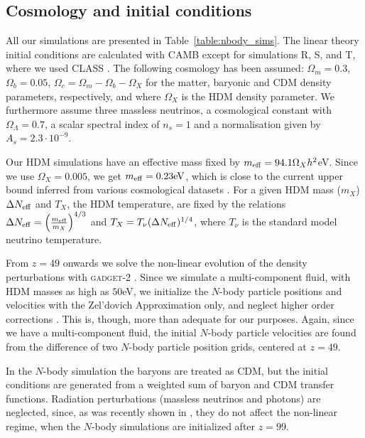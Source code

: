 \documentclass[11pt,a4paper]{article}
\renewcommand\({\left(}
\renewcommand\){\right)}
\renewcommand\[{\left[}
\renewcommand\]{\right]}
\begin{document}
\subsection{Cosmology and initial conditions}
All our simulations are presented in Table~\ref{table:nbody_sims}. The linear theory initial conditions are calculated with CAMB \cite{Lewis:1999bs} except for simulations R, S, and T, where we used CLASS \cite{Lesgourgues:2011re,Blas:2011rf,Lesgourgues:2011rg,Lesgourgues:2011rh}. The following cosmology has been assumed: $\Omega_m =  0.3$, $\Omega_b= 0.05$, $\Omega_c = \Omega_m - \Omega_b-\Omega_X$ for the matter, baryonic and CDM density parameters, respectively, and where $\Omega_X$ is the HDM density parameter. We furthermore assume three massless neutrinos, a cosmological constant with $\Omega_\Lambda = 0.7$, a scalar spectral index of $n_s=1$ and a normalisation given by $A_s = 2.3\cdot 10^{-9}$.

Our HDM simulations have an effective mass fixed by $m_{\rm eff} = 94.1  \Omega_X h^2$eV. Since we use $\Omega_X = 0.005$, we get $m_{\rm eff}=0.23{\rm eV}$, which is close to the current upper bound inferred from various cosmological datasets \cite{Ade:2015xua}. For a given HDM mass ($m_X$) $\Delta N_{\rm eff}$ and $T_X$, the HDM temperature, are fixed by the relations $\Delta N_{\rm eff} = \left(\frac{m_{\rm eff}}{m_X}\right)^{4/3}$ and $T_X = T_\nu  (\Delta N_{\rm eff})^{1/4}$, where $T_\nu$ is the standard model neutrino temperature.

From $z=49$ onwards we solve the non-linear evolution of the density perturbations with \textsc{gadget}-2 \cite{Springel:2005mi}. Since we simulate a multi-component fluid, with HDM masses as high as $50$eV, we initialize the $N$-body particle positions and velocities with the Zel'dovich Approximation \cite{Zeldovich:1969sb} only, and neglect higher order corrections \cite{Crocce:2006ve}. This is, though, more than adequate for our purposes. Again, since we have a multi-component fluid, the initial $N$-body particle velocities are found from the difference of two $N$-body particle position grids, centered at $z=49$.

In the $N$-body simulation the baryons are treated as CDM, but the initial conditions are generated from a weighted sum of baryon and CDM transfer functions. Radiation perturbations (massless neutrinos and photons) are neglected, since, as was recently shown in \cite{Brandbyge:2016raj, Adamek:2017grt}, they do not affect the non-linear regime, when the $N$-body simulations are initialized after $z=99$.
\end{document}
